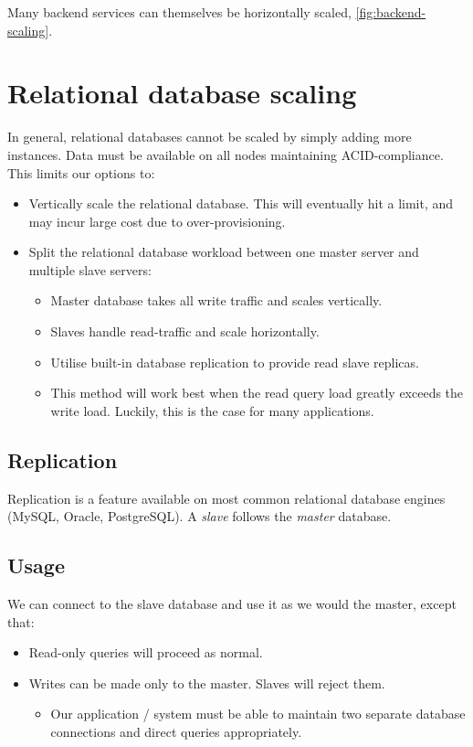 \documentclass[slides]{pgnotes}
\begin{document}
Many backend services can themselves be horizontally scaled, \autoref{fig:backend-scaling}. 



\newpage

\section{Relational database scaling}

In general, relational databases cannot be scaled by simply adding more instances.
Data must be available on all nodes maintaining ACID-compliance.
This limits our options to:
\begin{itemize}
\item Vertically scale the relational database.
  This will eventually hit a limit, and may incur large cost due to over-provisioning.
\item Split the relational database workload between one master server and multiple slave servers:
  \begin{itemize}
  \item Master database takes all write traffic and scales vertically.
  \item Slaves handle read-traffic and scale horizontally.
  \item Utilise built-in database replication to provide read slave replicas.
  \item
    This method will work best when the read query load greatly exceeds the write load.
    Luckily, this is the case for many applications.
  \end{itemize}
\end{itemize}

\subsection{Replication}

Replication is a feature available on most common relational database engines (MySQL, Oracle, PostgreSQL). 
A \textit{slave} follows the \textit{master} database.
\subsection{Usage}

We can connect to the slave database and use it as we would the master, except that:
\begin{itemize}
\item Read-only queries will proceed as normal.
\item Writes can be made only to the master. Slaves will reject them.
  \begin{itemize}
  \item Our application / system must be able to maintain two separate database connections and direct queries appropriately.
  \end{itemize}
\end{itemize}
\end{document}
